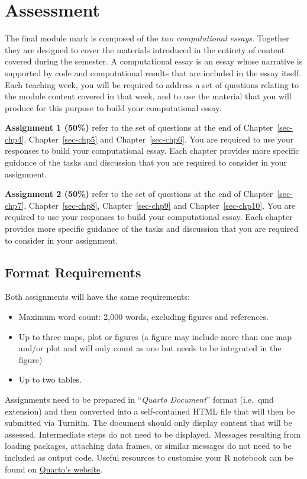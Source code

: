 \documentclass[
  letterpaper,
  DIV=11,
  numbers=noendperiod,
  oneside]{scrreprt}
\providecommand{\tightlist}{%
  \setlength{\itemsep}{0pt}\setlength{\parskip}{0pt}}\usepackage{longtable,booktabs,array}
\begin{document}
\section{Assessment}\label{assessment}

The final module mark is composed of the \emph{two computational
essays}. Together they are designed to cover the materials introduced in
the entirety of content covered during the semester. A computational
essay is an essay whose narrative is supported by code and computational
results that are included in the essay itself. Each teaching week, you
will be required to address a set of questions relating to the module
content covered in that week, and to use the material that you will
produce for this purpose to build your computational essay.

\textbf{Assignment 1 (50\%)} refer to the set of questions at the end of
Chapter~\ref{sec-chp4}, Chapter~\ref{sec-chp5} and
Chapter~\ref{sec-chp6}. You are required to use your responses to build
your computational essay. Each chapter provides more specific guidance
of the tasks and discussion that you are required to consider in your
assignment.

\textbf{Assignment 2 (50\%)} refer to the set of questions at the end of
Chapter~\ref{sec-chp7}, Chapter~\ref{sec-chp8}, Chapter~\ref{sec-chp9}
and Chapter~\ref{sec-chp10}. You are required to use your responses to
build your computational essay. Each chapter provides more specific
guidance of the tasks and discussion that you are required to consider
in your assignment.

\subsection{Format Requirements}\label{format-requirements}

Both assignments will have the same requirements:

\begin{itemize}
\tightlist
\item
  Maximum word count: 2,000 words, excluding figures and references.
\item
  Up to three maps, plot or figures (a figure may include more than one
  map and/or plot and will only count as one but needs to be integrated
  in the figure)
\item
  Up to two tables.
\end{itemize}

Assignments need to be prepared in ``\emph{Quarto Document}'' format
(i.e.~qmd extension) and then converted into a self-contained HTML file
that will then be submitted via Turnitin. The document should only
display content that will be assessed. Intermediate steps do not need to
be displayed. Messages resulting from loading packages, attaching data
frames, or similar messages do not need to be included as output code.
Useful resources to customise your R notebook can be found on
\href{https://quarto.org/docs/guide/}{Quarto's website}.
\end{document}
